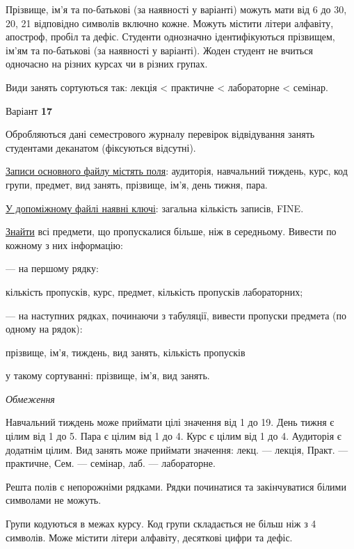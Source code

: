 \documentclass[11pt, ukrainian]{article}
\begin{document}
Прізвище, ім’я та по-батькові (за наявності у варіанті)
можуть мати від 6 до 30, 20, 21 відповідно символів включно кожне.
Можуть містити літери алфавіту, апостроф, пробіл та дефіс.
Студенти однозначно ідентифікуються прізвищем, ім’ям та по-батькові (за наявності у варіанті).
Жоден студент не вчиться одночасно на різних курсах чи в різних групах.

Види занять сортуються так: лекція < практичне < лабораторне < семінар.



\par
\newpage
{\center Варіант  \No \textbf { 17 }\par}
\bigskip
Обробляються дані семестрового журналу перевірок відвідування занять студентами деканатом (фіксуються відсутні). 

\underline{Записи основного файлу містять поля}: аудиторія, навчальний тиждень, курс, код групи, предмет, вид занять, прізвище, ім’я, день тижня, пара.

\underline{У допоміжному файлі наявні ключі}: загальна кількість записів, FINE.

\underline{Знайти} всі предмети, що пропускалися більше, ніж в середньому. Вивести по кожному з них інформацію:\par
{\noindent}--- на першому рядку:\par
кількість пропусків, курс, предмет, кількість пропусків лабораторних;

{\noindent}--- на наступних рядках, починаючи з табуляції, вивести пропуски предмета (по одному на рядок):\par
прізвище, ім’я, тиждень, вид занять, кількість пропусків

{\noindent}у такому сортуванні: прізвище, ім’я, вид занять.


\bigskip\textit{Обмеження}

Навчальний тиждень може приймати цілі значення від 1 до 19.
День тижня є цілим від 1 до 5. Пара є цілим від 1 до 4.
Курс є цілим від 1 до 4. Аудиторія є додатнім цілим.
Вид занять може приймати значення:
лекц. --- лекція, Практ. --- практичне, Сем. --- семінар, лаб. --- лабораторне.

Решта полів є непорожніми рядками.
Рядки починатися та закінчуватися білими символами не можуть.

Групи кодуються в межах курсу.
Код групи складається не більш ніж з 4 символів.
Може містити літери алфавіту, десяткові цифри та дефіс.
\end{document}
